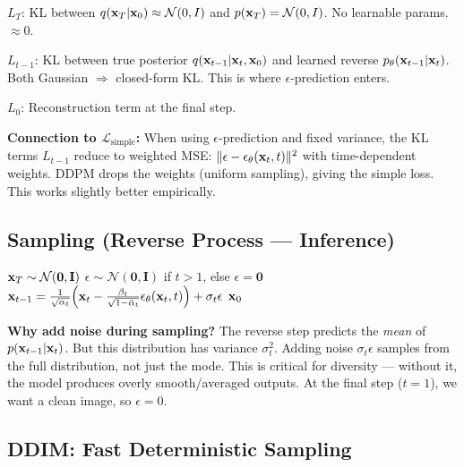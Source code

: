 \textbf{$L_T$}: KL between $q(\mathbf{x}_T|\mathbf{x}_0) \approx \mathcal{N}(0,I)$ and $p(\mathbf{x}_T) = \mathcal{N}(0,I)$. No learnable params. $\approx 0$.

\textbf{$L_{t-1}$}: KL between true posterior $q(\mathbf{x}_{t-1}|\mathbf{x}_t,\mathbf{x}_0)$ and learned reverse $p_\theta(\mathbf{x}_{t-1}|\mathbf{x}_t)$. Both Gaussian $\Rightarrow$ closed-form KL. This is where $\epsilon$-prediction enters.

\textbf{$L_0$}: Reconstruction term at the final step.

\textbf{Connection to $\mathcal{L}_{\text{simple}}$:} When using $\epsilon$-prediction and fixed variance, the KL terms $L_{t-1}$ reduce to weighted MSE: $\|\epsilon - \epsilon_\theta(\mathbf{x}_t, t)\|^2$ with time-dependent weights. DDPM drops the weights (uniform sampling), giving the simple loss. This works slightly better empirically.

\subsection{Sampling (Reverse Process — Inference)}

\begin{algorithm}[H]
\caption{DDPM Sampling}\small
\begin{algorithmic}[1]
\State $\mathbf{x}_T \sim \mathcal{N}(\mathbf{0}, \mathbf{I})$ 
    \State $\epsilon \sim \mathcal{N}(\mathbf{0},\mathbf{I})$ if $t > 1$, else $\epsilon = \mathbf{0}$
    \State $\mathbf{x}_{t-1} = \frac{1}{\sqrt{\alpha_t}}\!\left(\mathbf{x}_t - \frac{\beta_t}{\sqrt{1-\bar\alpha_t}}\epsilon_\theta(\mathbf{x}_t, t)\right) + \sigma_t\epsilon$
\EndFor
\State \Return $\mathbf{x}_0$
\end{algorithmic}
\end{algorithm}

\textbf{Why add noise during sampling?} The reverse step predicts the \emph{mean} of $p(\mathbf{x}_{t-1}|\mathbf{x}_t)$. But this distribution has variance $\sigma_t^2$. Adding noise $\sigma_t\epsilon$ samples from the full distribution, not just the mode. This is critical for diversity — without it, the model produces overly smooth/averaged outputs. At the final step ($t=1$), we want a clean image, so $\epsilon = 0$.

\subsection{DDIM: Fast Deterministic Sampling}

